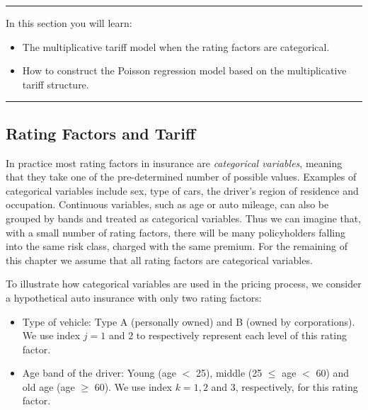 \documentclass[]{book}
\providecommand{\tightlist}{%
  \setlength{\itemsep}{0pt}\setlength{\parskip}{0pt}}
\theoremstyle{definition}
\theoremstyle{definition}
\theoremstyle{definition}
\theoremstyle{remark}
\begin{document}
\begin{center}\rule{0.5\linewidth}{\linethickness}\end{center}

In this section you will learn:

\begin{itemize}
\tightlist
\item
  The multiplicative tariff model when the rating factors are
  categorical.\\
\item
  How to construct the Poisson regression model based on the
  multiplicative tariff structure.
\end{itemize}

\begin{center}\rule{0.5\linewidth}{\linethickness}\end{center}

\subsection{Rating Factors and Tariff}\label{rating-factors-and-tariff}

In practice most rating factors in insurance are \emph{categorical
variables}, meaning that they take one of the pre-determined number of
possible values. Examples of categorical variables include sex, type of
cars, the driver's region of residence and occupation. Continuous
variables, such as age or auto mileage, can also be grouped by bands and
treated as categorical variables. Thus we can imagine that, with a small
number of rating factors, there will be many policyholders falling into
the same risk class, charged with the same premium. For the remaining of
this chapter we assume that all rating factors are categorical
variables.

To illustrate how categorical variables are used in the pricing process,
we consider a hypothetical auto insurance with only two rating factors:

\begin{itemize}
\tightlist
\item
  Type of vehicle: Type A (personally owned) and B (owned by
  corporations). We use index \(j=1\) and \(2\) to respectively
  represent each level of this rating factor.\\
\item
  Age band of the driver: Young (age \(<\) 25), middle (25 \(\le\) age
  \(<\) 60) and old age (age \(\ge\) 60). We use index \(k=1, 2\) and
  \(3\), respectively, for this rating factor.
\end{itemize}
\end{document}
